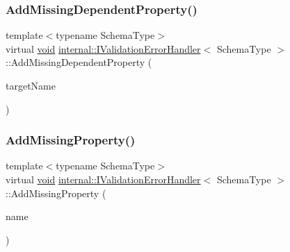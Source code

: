 \mbox{\label{classinternal_1_1IValidationErrorHandler_a2e9e0b2f67467a62642e37e839f689c5}} 
\subsubsection{\texorpdfstring{Add\+Missing\+Dependent\+Property()}{AddMissingDependentProperty()}}
{\footnotesize\ttfamily template$<$typename Schema\+Type$>$ \\
virtual \hyperlink{imgui__impl__opengl3__loader_8h_ac668e7cffd9e2e9cfee428b9b2f34fa7}{void} \hyperlink{classinternal_1_1IValidationErrorHandler}{internal\+::\+I\+Validation\+Error\+Handler}$<$ Schema\+Type $>$\+::Add\+Missing\+Dependent\+Property (\begin{DoxyParamCaption}\item[{const \hyperlink{classinternal_1_1IValidationErrorHandler_a22eda6c4ea9537f1ba00d76af052649a}{S\+Value} \&}]{target\+Name }\end{DoxyParamCaption})\hspace{0.3cm}{\ttfamily [pure virtual]}}

\mbox{\label{classinternal_1_1IValidationErrorHandler_a3a2165f53ab565e052bcd35b6d19e473}} 
\subsubsection{\texorpdfstring{Add\+Missing\+Property()}{AddMissingProperty()}}
{\footnotesize\ttfamily template$<$typename Schema\+Type$>$ \\
virtual \hyperlink{imgui__impl__opengl3__loader_8h_ac668e7cffd9e2e9cfee428b9b2f34fa7}{void} \hyperlink{classinternal_1_1IValidationErrorHandler}{internal\+::\+I\+Validation\+Error\+Handler}$<$ Schema\+Type $>$\+::Add\+Missing\+Property (\begin{DoxyParamCaption}\item[{const \hyperlink{classinternal_1_1IValidationErrorHandler_a22eda6c4ea9537f1ba00d76af052649a}{S\+Value} \&}]{name }\end{DoxyParamCaption})\hspace{0.3cm}{\ttfamily [pure virtual]}}

